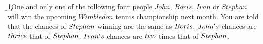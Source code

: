 
\ADD\vbnine\vbten\a
\ADD{}\b
\SUBTRACT\b{1}\c

\question One and only one of the following four people $John$, $Boris$, 
$Ivan$ or $Stephan$ will win the upcoming $Wimbledon$ tennis championship 
next month. You are told that the chances of $Stephan$ winning are the 
same as $Boris$. $John's$ chances are $thrice$ that of $Stephan$. 
$Ivan's$ chances are $two$ times that of $Stephan$.


\watchout

